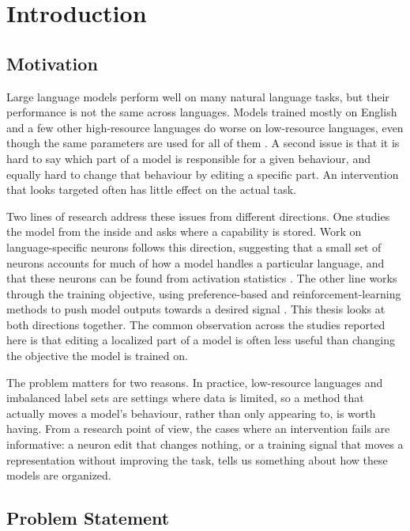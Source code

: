 \chapter{Introduction}
\label{ch:introduction}

\section{Motivation}
\label{sec:intro-motivation}

Large language models perform well on many natural language tasks, but their
performance is not the same across languages. Models trained mostly on English and
a few other high-resource languages do worse on low-resource languages, even
though the same parameters are used for all of them
\citep{conneau2018xnli, shi2022mgsm}. A second issue is that it is hard to say
which part of a model is responsible for a given behaviour, and equally hard to
change that behaviour by editing a specific part. An intervention that looks
targeted often has little effect on the actual task.

Two lines of research address these issues from different directions. One studies
the model from the inside and asks where a capability is stored. Work on
language-specific neurons follows this direction, suggesting that a small set of
neurons accounts for much of how a model handles a particular language, and that
these neurons can be found from activation statistics
\citep{tang2024language, kojima2024multilingual}. The other line works through the
training objective, using preference-based and reinforcement-learning methods to
push model outputs towards a desired signal
\citep{rafailov2023direct, shao2024deepseekmath}. This thesis looks at both
directions together. The common observation across the studies reported here is
that editing a localized part of a model is often less useful than changing the
objective the model is trained on.

The problem matters for two reasons. In practice, low-resource languages and
imbalanced label sets are settings where data is limited, so a method that
actually moves a model's behaviour, rather than only appearing to, is worth
having. From a research point of view, the cases where an intervention fails are
informative: a neuron edit that changes nothing, or a training signal that moves a
representation without improving the task, tells us something about how these
models are organized.

\section{Problem Statement}
\label{sec:intro-problem}

